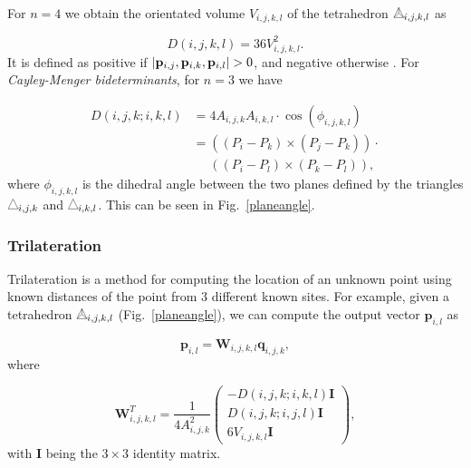 For $n=4$ we obtain the orientated volume $V_{i,j,k,l}$ of the tetrahedron $\pppp_{i,j,k,l}$ as

\begin{equation}
    D(i,j,k,l)=36V_{i,j,k,l}^2.
    \label{eq2}
\end{equation}
It is defined as positive if $\abs{\mathbf{p}_{i,j},\mathbf{p}_{i,k},\mathbf{p}_{i,l}}>0$, and negative otherwise \cite{rojas2017distance}. For \textit{Cayley-Menger bideterminants}, for $n=3$ we have 

\begin{align}
    D(i,j,k;i,k,l)&=4A_{i,j,k}A_{i,k,l}\cdot\cos{(\phi_{i,j,k,l})} \nonumber \\
    &=((P_i-P_k)\times(P_j-P_k))\cdot \nonumber\\
    &\,\,\,\,\,\,\,\,((P_i-P_l)\times(P_k-P_l)),
    \label{eq3}
\end{align}
where $\phi_{i,j,k,l}$ is the dihedral angle between the two planes defined by the triangles $\ppp_{i,j,k}$ and $\ppp_{i,k,l}$. This can be seen in Fig.~\ref{planeangle}.

\subsubsection{Trilateration}
Trilateration is a method for computing the location of an unknown point using known distances of the point from 3 different known sites. For example, given a tetrahedron $\pppp_{i,j,k,l}$ (Fig.~\ref{planeangle}), we can compute the output vector $\textbf{p}_{i,l}$ as \cite{rojas2017distance}

\begin{equation}
    \textbf{p}_{i,l} = \textbf{W}_{i,j,k,l}\textbf{q}_{i,j,k},
    \label{eq-w}
\end{equation}
where

\begin{equation}
    \textbf{W}_{i,j,k,l}^T=\frac{1}{4A_{i,j,k}^2}\left(\begin{array}{c}
    -D(i,j,k;i,k,l)\textbf{I}\\
    D(i,j,k;i,j,l)\textbf{I}\\
    6V_{i,j,k,l}\textbf{I}
    \end{array}\right),
    \label{eq-w2}
\end{equation}
with \textbf{I} being the $3\times3$ identity matrix.

